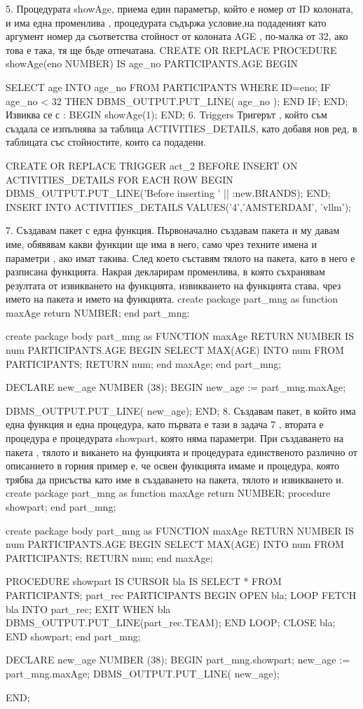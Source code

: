5. Процедурата showAge, приема един параметър, който е номер от ID колоната, и има една променлива , процедурата  съдържа условие,на подаденият като аргумент номер да  съответства стойност  от колоната AGE , по-малка от 32, ако това е така, тя ще бъде отпечатана. 
CREATE OR REPLACE PROCEDURE showAge(eno NUMBER)
IS
age_no PARTICIPANTS.AGE%
BEGIN

SELECT age INTO age_no
FROM  PARTICIPANTS
WHERE ID=eno;
IF age_no < 32
THEN
DBMS_OUTPUT.PUT_LINE( age_no );
END IF;
END;
Извиква се с : 
BEGIN
showAge(1);
END;
6. Triggers Тригерът , който съм създала се изпълнява за таблица ACTIVITIES_DETAILS, като добавя нов ред, в таблицата със стойностите, които са подадени. 

CREATE OR REPLACE TRIGGER act_2
BEFORE
INSERT
ON ACTIVITIES_DETAILS
FOR EACH ROW
BEGIN
DBMS_OUTPUT.PUT_LINE('Before inserting ' || :new.BRANDS);
END;
INSERT INTO ACTIVITIES_DETAILS
VALUES('4','AMSTERDAM', 'vllm');

7. Създавам пакет с една функция. Първоначално създавам пакета и му давам име, обявявам какви функции ще има в него, само чрез техните имена и параметри , ако имат такива. След което съставям тялото на пакета, като в него е разписана функцията. Накрая декларирам променлива, в която съхранявам резултата от извикването на функцията, извикването на функцията става, чрез името на пакета и името на функцията. 
 create package part_mng as
function maxAge return NUMBER; 
end part_mng;
 
create package body part_mng as
FUNCTION maxAge
RETURN NUMBER
IS
num PARTICIPANTS.AGE%
BEGIN 
SELECT MAX(AGE) INTO num 
FROM PARTICIPANTS;
RETURN num;
end maxAge;
end part_mng;

DECLARE
new_age NUMBER (38);
BEGIN
new_age := part_mng.maxAge;

DBMS_OUTPUT.PUT_LINE( new_age);
END;
8.  Създавам пакет, в който има една функция и една процедура, като първата е тази в задача 7 , втората е процедура е процедурата showpart, която няма параметри. При създаването на пакета , тялото и викането на фунцкията и процедурата единственото различно от описанието в горния пример е, че освен функцията имаме и процедура, която трябва да присъства като име в създаването на пакета, тялото и извикването и. 
 create package part_mng as
function maxAge return NUMBER; 
procedure showpart;
end part_mng;
 
create package body part_mng as
FUNCTION maxAge
RETURN NUMBER
IS
num PARTICIPANTS.AGE%
BEGIN 
SELECT MAX(AGE) INTO num 
FROM PARTICIPANTS;
RETURN num;
end maxAge;

PROCEDURE showpart
IS
CURSOR bla IS SELECT * FROM PARTICIPANTS;
part_rec PARTICIPANTS%
BEGIN
OPEN bla;
LOOP
FETCH bla INTO part_rec;
EXIT WHEN bla%
DBMS_OUTPUT.PUT_LINE(part_rec.TEAM);
END LOOP;
CLOSE bla;
END showpart;
end part_mng;

DECLARE
new_age NUMBER (38);
BEGIN
part_mng.showpart;
new_age := part_mng.maxAge;
DBMS_OUTPUT.PUT_LINE( new_age);
 
END;
